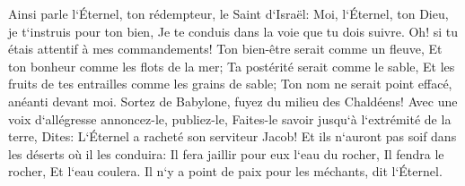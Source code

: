 \verse Ainsi parle l`Éternel, ton rédempteur, le Saint d`Israël: Moi, l`Éternel, ton Dieu, je t`instruis pour ton bien, Je te conduis dans la voie que tu dois suivre. 
\verse Oh! si tu étais attentif à mes commandements! Ton bien-être serait comme un fleuve, Et ton bonheur comme les flots de la mer; 
\verse Ta postérité serait comme le sable, Et les fruits de tes entrailles comme les grains de sable; Ton nom ne serait point effacé, anéanti devant moi. 
\verse Sortez de Babylone, fuyez du milieu des Chaldéens! Avec une voix d`allégresse annoncez-le, publiez-le, Faites-le savoir jusqu`à l`extrémité de la terre, Dites: L`Éternel a racheté son serviteur Jacob! 
\verse Et ils n`auront pas soif dans les déserts où il les conduira: Il fera jaillir pour eux l`eau du rocher, Il fendra le rocher, Et l`eau coulera. 
\verse Il n`y a point de paix pour les méchants, dit l`Éternel. 

